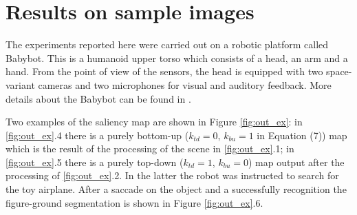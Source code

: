 \documentclass{llncs}
\begin{document}
\section{Results on sample images}
\label{sec:att_results}
The experiments reported here were carried out
on a robotic platform called Babybot. This is a
humanoid upper torso which consists of a head, an arm
and a hand. 
From the point of view of the sensors, the head is
equipped with two space-variant cameras \cite{SandiniQSM00}
and two microphones for visual and auditory feedback.
More details about the Babybot can be found in \cite{Natale04}.

Two examples of the saliency map are shown in
Figure \ref{fig:out_ex}: in \ref{fig:out_ex}.4 there is a purely bottom-up ($k_{td}=0$,
$k_{bu}=1$ in Equation (7)) map which is the result of the
processing of the scene in \ref{fig:out_ex}.1; in \ref{fig:out_ex}.5 there is a purely
top-down ($k_{td}=1$, $k_{bu}=0$) map output after the
processing of \ref{fig:out_ex}.2. In the latter the robot was instructed
to search for the toy airplane. After a saccade on the
object and a successfully recognition the figure-ground
segmentation is shown in Figure \ref{fig:out_ex}.6.


\end{document}
